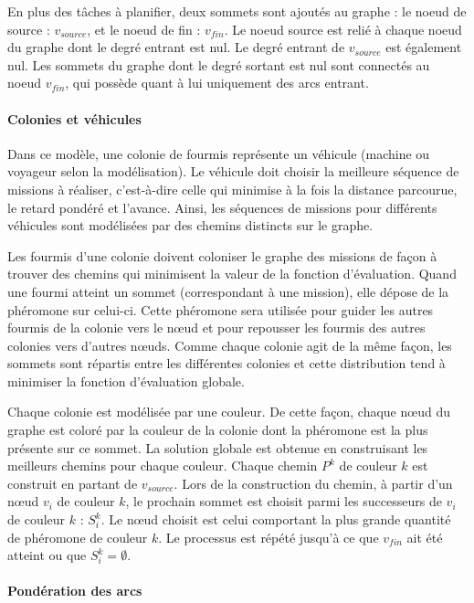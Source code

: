 En plus des tâches à planifier, deux sommets sont ajoutés au graphe : le noeud de source : $v_{source}$, et le noeud de fin : $v_{fin}$. Le noeud source est relié à chaque noeud du graphe dont le degré entrant est nul. Le degré entrant de $v_{source}$ est également nul. Les sommets du graphe dont le degré sortant est nul sont connectés au noeud $v_{fin}$, qui possède quant à lui uniquement des arcs entrant.

\paragraph{Colonies et véhicules}

Dans ce modèle, une colonie de fourmis représente un véhicule (machine ou voyageur selon la modélisation). Le véhicule doit choisir la meilleure séquence de missions à réaliser, c'est-à-dire celle qui minimise à la fois la distance parcourue, le retard pondéré et l'avance. Ainsi, les séquences de missions pour différents véhicules sont modélisées par des chemins distincts sur le graphe. 

Les fourmis d'une colonie doivent coloniser le graphe des missions de façon à trouver des chemins qui minimisent la valeur de la fonction d'évaluation.
Quand une fourmi atteint un sommet (correspondant à une mission), elle dépose de la phéromone sur celui-ci. Cette phéromone sera utilisée pour guider les autres fourmis de la colonie vers le n\oe{}ud et pour repousser les fourmis des autres colonies vers d'autres n\oe{}uds.
Comme chaque colonie agit de la même façon, les sommets sont répartis entre les différentes colonies et cette distribution tend à minimiser la fonction d'évaluation globale.

Chaque colonie est modélisée par une couleur. De cette façon, chaque n\oe{}ud du graphe est coloré par la couleur de la colonie dont la phéromone est la plus présente sur ce sommet. La solution globale est obtenue en construisant les meilleurs chemins pour chaque couleur. Chaque chemin $P^k$ de couleur $k$ est construit en partant de $v_{source}$. Lors de la construction du chemin, à partir d'un n\oe{}ud $v_i$ de couleur $k$, le prochain sommet est choisit parmi les successeurs de $v_i$ de couleur $k$ : $S^k_i$. Le n\oe{}ud choisit est celui comportant la plus grande quantité de phéromone de couleur $k$. Le processus est répété jusqu'à ce que $v_{fin}$ ait été atteint ou que $S^k_i=\emptyset$.

\paragraph{Pondération des arcs}

